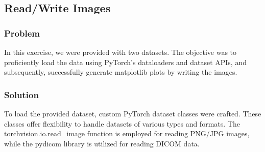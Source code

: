 \subsection{Read/Write Images}
\label{sec:warmup1}
    \subsubsection{Problem}
        In this exercise, we were provided with two datasets. The objective was to proficiently load the data using PyTorch's dataloaders and dataset APIs, and subsequently, successfully generate matplotlib plots by writing the images.
    \subsubsection{Solution}
        
    To load the provided dataset, custom PyTorch dataset classes were crafted. These classes offer flexibility to handle datasets of various types and formats. The torchvision.io.read\_image function is employed for reading PNG/JPG images, while the pydicom library is utilized for reading DICOM data.
    
